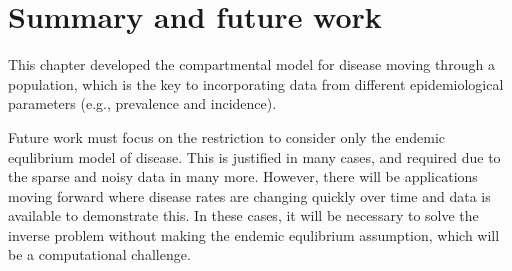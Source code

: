 \section{Summary and future work}
This chapter developed the compartmental model for disease moving
through a population, which is the key to incorporating data from
different epidemiological parameters (e.g., prevalence and incidence).

Future work must focus on the restriction to consider only the endemic
equlibrium model of disease.  This is justified in many cases, and
required due to the sparse and noisy data in many more.  However,
there will be applications moving forward where disease rates are
changing quickly over time and data is available to demonstrate this.
In these cases, it will be necessary to solve the inverse problem
without making the endemic equlibrium assumption, which will be a
computational challenge.
